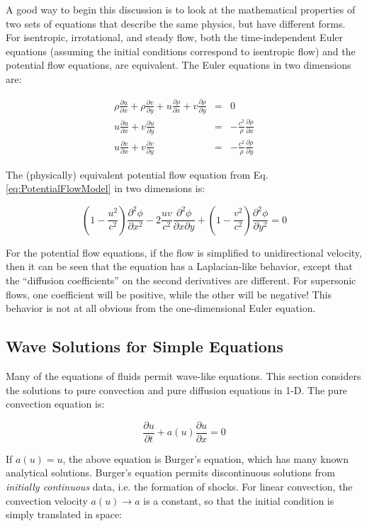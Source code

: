 \documentclass[10pt]{article}
\newcommand{\beq}{\begin{equation}}
\newcommand{\eeq}{\end{equation}}
\begin{document}
\begin{flushleft}
A good way to begin this discussion is to look at the mathematical properties of two sets of equations that describe the same physics, but have different forms. For isentropic, irrotational, and steady flow, both the time-independent Euler equations (assuming the initial conditions correspond to isentropic flow) and the potential flow equations, are equivalent. The Euler equations in two dimensions are:

\begin{subequations}
\label{eq:2DEuler}
\begin{eqnarray}
\rho\frac{\partial u}{\partial x}+\rho\frac{\partial v}{\partial y}+u\frac{\partial\rho}{\partial x}+v\frac{\partial\rho}{\partial y}&=&0\\
u\frac{\partial u}{\partial x}+v\frac{\partial u}{\partial y}&=&-\frac{c^2}{\rho}\frac{\partial\rho}{\partial x}\\
u\frac{\partial v}{\partial x}+v\frac{\partial v}{\partial y}&=&-\frac{c^2}{\rho}\frac{\partial\rho}{\partial y}
\end{eqnarray}
\end{subequations}

The (physically) equivalent potential flow equation from Eq. \eqref{eq:PotentialFlowModel} in two dimensions is:

\beq
\left(1-\frac{u^2}{c^2}\right)\frac{\partial^2\phi}{\partial x^2}-2\frac{uv}{c^2}\frac{\partial^2\phi}{\partial x\partial y}+\left(1-\frac{v^2}{c^2}\right)\frac{\partial^2\phi}{\partial y^2}=0
\eeq

For the potential flow equations, if the flow is simplified to unidirectional velocity, then it can be seen that the equation has a Laplacian-like behavior, except that the ``diffusion coefficients'' on the second derivatives are different. For supersonic flows, one coefficient will be positive, while the other will be negative! This behavior is not at all obvious from the one-dimensional Euler equation.

\subsection{Wave Solutions for Simple Equations}
Many of the equations of fluids permit wave-like equations. This section considers the solutions to pure convection and pure diffusion equations in 1-D. The pure convection equation is:

\beq
\frac{\partial u}{\partial t}+a(u)\frac{\partial u}{\partial x}=0
\eeq

If \(a(u)=u\), the above equation is Burger's equation, which has many known analytical solutions. Burger's equation permits discontinuous solutions from {\it initially continuous} data, i.e. the formation of shocks. For linear convection, the convection velocity \(a(u)\rightarrow a\) is a constant, so that the initial condition is simply translated in space:


\end{flushleft}
\end{document}
